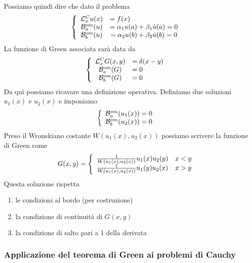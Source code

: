 Possiamo quindi dire che dato il problema
\begin{align}
	\triple{\mathcal{L}_x^{C} u(x) &= f(x) \hfill}{\mathcal{B}^{om}_a(u) &= \alpha_1 u(a) + \beta_1 \dot{u}(a) = 0}{\mathcal{B}^{om}_b(u) &= \alpha_2 u(b) + \beta_2 \dot{u}(b) = 0} \label{omcond1}
\end{align}
La funzione di Green associata sarà data da
\begin{align}
	\triple{\mathcal{L}_x^{C} G(x,y) &= \delta(x-y)}{\mathcal{B}^{om}_a(G) &= 0 \hfill}{\mathcal{B}^{om}_b(G) &= 0 \hfill}
\end{align}
Da qui possiamo ricavare una definizione operativa. Definiamo due soluzioni $u_1(x)$ e $u_2(x)$ e imponiamo
\begin{align}
	\left\{ \begin{array}{cc} \mathcal{B}^{om}_a(u_1(x)) = 0\\ \mathcal{B}^{om}_b(u_2(x)) = 0 \end{array} \right.
\end{align}
Preso il Wronskiano costante $W(u_1(x),u_2(x))$ possiamo scrivere la funzione di Green come
\begin{align}
	G(x,y) = \left\{ \begin{array}{cc} \frac{1}{W(u_1(x),u_2(x))}u_1(x)u_2(y) \quad x<y\\ \frac{1}{W(u_1(x),u_2(x))}u_1(y)u_2(x) \quad x>y \end{array} \right.
\end{align}
Questa soluzione rispetta 
\begin{enumerate}
	\item le condizioni al bordo (per costruzione) 
	\item la condizione di continuità di $G(x,y)$
	\item la condizione di salto pari a 1 della derivata
\end{enumerate}
\newpage
\subsubsection{Applicazione del teorema di Green ai problemi di Cauchy}

